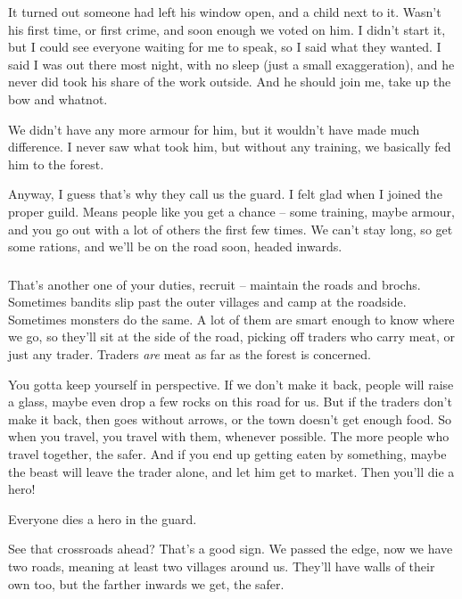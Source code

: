 \begin{multicols}{2}
\begin{exampletext}
  It turned out someone had left his window open, and a child next to it.
  Wasn't his first time, or first crime, and soon enough we voted on him.
  I didn't start it, but I could see everyone waiting for me to speak, so I said what they wanted.
  I said I was out there most night, with no sleep (just a small exaggeration), and he never did took his share of the work outside.
  And he should join me, take up the bow and whatnot.

  We didn't have any more armour for him, but it wouldn't have made much difference.
  I never saw what took him, but without any training, we basically fed him to the forest.
  
  Anyway, I guess that's why they call us the \gls{guard}.
  I felt glad when I joined the proper guild.
  Means people like you get a chance -- some training, maybe armour, and you go out with a lot of others the first few times.
  We can't stay long, so get some rations, and we'll be on the road soon, headed inwards.

  \subsubsection*{}

  That's another one of your duties, recruit -- maintain the roads and \glspl{broch}.
  Sometimes bandits slip past the outer \glspl{village} and camp at the roadside.
  Sometimes \glspl{monster} do the same.
  A lot of them are smart enough to know where we go, so they'll sit at the side of the road, picking off traders who carry meat, or just any trader.
  Traders \emph{are} meat as far as the forest is concerned.

  You gotta keep yourself in perspective.
  If we don't make it back, people will raise a glass, maybe even drop a few rocks on this road for us.
  But if the traders don't make it back, then  goes without arrows, or the town doesn't get enough food.
  So when you travel, you travel with them, whenever possible.
  The more people who travel together, the safer.
  And if you end up getting eaten by something, maybe the beast will leave the trader alone, and let him get to market.
  Then you'll die a hero!

  Everyone dies a hero in the \gls{guard}.

  See that crossroads ahead?
  That's a good sign.
  We passed the \gls{edge}, now we have two roads, meaning at least two \glspl{village} around us.
  They'll have walls of their own too, but the farther inwards we get, the safer.


\end{exampletext}
\end{multicols}
